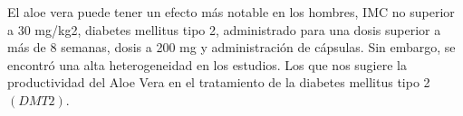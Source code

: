 El aloe vera puede tener un efecto más notable en los hombres, IMC no superior a 30 mg/kg2, diabetes mellitus tipo 2, administrado para una dosis superior a más de 8 semanas, dosis a 200 mg y administración de cápsulas. Sin embargo, se encontró una alta heterogeneidad en los estudios. Los que nos sugiere la productividad del Aloe Vera en el tratamiento de la diabetes mellitus tipo 2 $(DMT2)$.\cite{Budiastutik2022}









